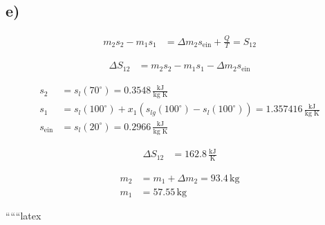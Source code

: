 

\subsection*{e)}

\begin{align*}
    m_2 s_2 - m_1 s_1 &= \Delta m_2 s_{\text{ein}} + \frac{Q}{T} = S_{12}
\end{align*}

\begin{align*}
    \Delta S_{12} &= m_2 s_2 - m_1 s_1 - \Delta m_2 s_{\text{ein}}
\end{align*}

\begin{align*}
    s_2 &= s_l(70^\circ) = 0.3548 \, \frac{\text{kJ}}{\text{kg K}} \\
    s_1 &= s_l(100^\circ) + x_1 \left( s_{lg}(100^\circ) - s_l(100^\circ) \right) = 1.357416 \, \frac{\text{kJ}}{\text{kg K}} \\
    s_{\text{ein}} &= s_l(20^\circ) = 0.2966 \, \frac{\text{kJ}}{\text{kg K}}
\end{align*}

\begin{align*}
    \Delta S_{12} &= 162.8 \, \frac{\text{kJ}}{\text{K}}
\end{align*}

\begin{align*}
    m_2 &= m_1 + \Delta m_2 = 93.4 \, \text{kg} \\
    m_1 &= 57.55 \, \text{kg}
\end{align*}

``````latex